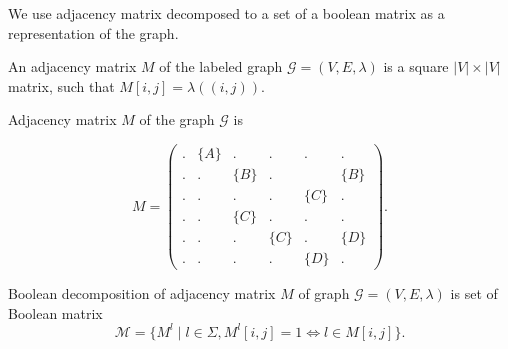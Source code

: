 We use adjacency matrix decomposed to a set of a boolean matrix as a representation of the graph.
\begin{definition}
An adjacency matrix $M$ of the labeled graph $\mathcal{G}=(V, E, \lambda)$ is a square $|V|\times|V|$ matrix, such that $M[i,j] = \lambda((i, j))$.
\end{definition}

Adjacency matrix $M$ of the graph $\mathcal{G}$ is

$$
    M =
    \begin{pmatrix}
    .     & \{A\} &   .   &   .   &   .   &   .   \\
    .     &   .   & \{B\} &   .   &       & \{B\} \\
    .     &   .   &   .   &   .   & \{C\} &   .   \\
    .     &   .   & \{C\} &   .   &   .   &   .   \\
    .     &   .   &   .   & \{C\} &   .   & \{D\} \\
    .     & .     &   .   &   .   & \{D\} &   .
    \end{pmatrix}.
$$

\begin{definition}

Boolean decomposition of adjacency matrix $M$ of graph $\mathcal{G}=(V, E, \lambda)$ is set of Boolean matrix $$\mathcal{M} = \{M^l \mid l \in \Sigma, M^l[i,j]=1 \iff l \in M[i,j]\}.$$

\end{definition}

